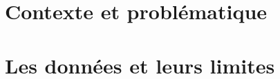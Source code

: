 \documentclass[12pt,a4paper]{report}
\begin{document}
\newcommand*{\pgdatesoutenance}{mars 2027}





\part{Contexte et problématique}
\label{part:contexte}

\part{Les données et leurs limites}
\label{part:donnees}
\end{document}

